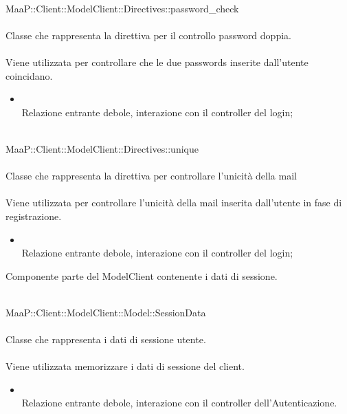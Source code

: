 \\
MaaP::Client::ModelClient::Directives::password\_check\\
\\
Classe che rappresenta la direttiva per il controllo password doppia.\\
\\
Viene utilizzata per controllare che le due passwords inserite dall'utente coincidano.\\
\begin{itemize}
\item{}\\
Relazione entrante debole, interazione con il controller del login;
\end{itemize}

\\
MaaP::Client::ModelClient::Directives::unique\\
\\
Classe che rappresenta la direttiva per controllare l'unicità della mail\\
\\
Viene utilizzata per controllare l'unicità della mail inserita dall'utente in fase di registrazione.\\
\begin{itemize}
\item{}\\
Relazione entrante debole, interazione con il controller del login;
\end{itemize}

Componente parte del ModelClient contenente i dati di sessione.

\\
MaaP::Client::ModelClient::Model::SessionData\\
\\
Classe che rappresenta i dati di sessione utente.\\
\\
Viene utilizzata memorizzare i dati di sessione del client.\\
\begin{itemize}
\item{}\\
Relazione entrante debole, interazione con il controller dell'Autenticazione.
\end{itemize}


